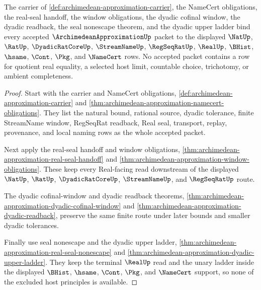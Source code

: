 \begin{theorem}
\label{thm:archimedean-approximation-kernel-scope}
The carrier of \autoref{def:archimedean-approximation-carrier}, the NameCert obligations, the real-seal handoff, the window obligations, the dyadic cofinal window, the dyadic readback, the seal nonescape theorem, and the dyadic upper ladder bind every accepted $\ArchimedeanApproximationUp$ packet to the displayed $\NatUp$, $\RatUp$, $\DyadicRatCoreUp$, $\StreamNameUp$, $\RegSeqRatUp$, $\RealUp$, $\BHist$, $\hsame$, $\Cont$, $\Pkg$, and $\NameCert$ rows. No accepted packet contains a row for quotient real equality, a selected host limit, countable choice, trichotomy, or ambient completeness.
\end{theorem}
\begin{proof}
Start with the carrier and NameCert obligations, \autoref{def:archimedean-approximation-carrier} and \autoref{thm:archimedean-approximation-namecert-obligations}. They list the natural bound, rational source, dyadic tolerance, finite StreamName window, RegSeqRat readback, Real seal, transport, replay, provenance, and local naming rows as the whole accepted packet.

Next apply the real-seal handoff and window obligations, \autoref{thm:archimedean-approximation-real-seal-handoff} and \autoref{thm:archimedean-approximation-window-obligations}. These keep every Real-facing read downstream of the displayed $\NatUp$, $\RatUp$, $\DyadicRatCoreUp$, $\StreamNameUp$, and $\RegSeqRatUp$ route.

The dyadic cofinal-window and dyadic readback theorems, \autoref{thm:archimedean-approximation-dyadic-cofinal-window} and \autoref{thm:archimedean-approximation-dyadic-readback}, preserve the same finite route under later bounds and smaller dyadic tolerances.

Finally use seal nonescape and the dyadic upper ladder, \autoref{thm:archimedean-approximation-real-seal-nonescape} and \autoref{thm:archimedean-approximation-dyadic-upper-ladder}. They keep the terminal $\RealUp$ read and the unary ladder inside the displayed $\BHist$, $\hsame$, $\Cont$, $\Pkg$, and $\NameCert$ support, so none of the excluded host principles is available.
\end{proof}

